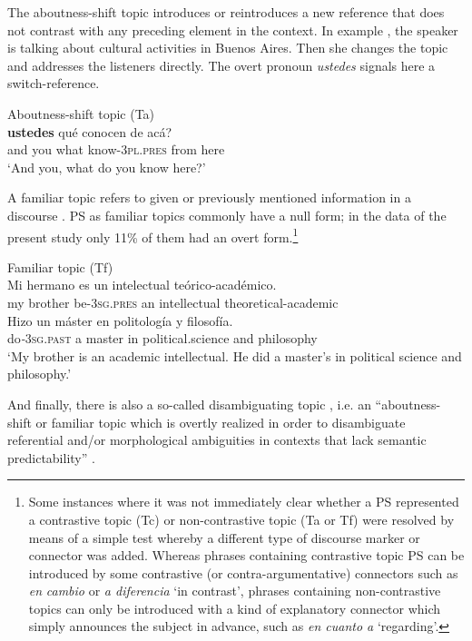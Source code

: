 \documentclass[output=paper]{langsci/langscibook}
\begin{document}
The aboutness-shift topic introduces or reintroduces a new reference that does not contrast with any preceding element in the context. In example , the speaker is talking about cultural activities in Buenos Aires. Then she changes the topic and addresses the listeners directly. The overt pronoun \textit{ustedes} signals here a switch-reference.


\ea\label{ex:pes:7}
             Aboutness-shift topic (Ta)\\
 \textbf{{ustedes}} qué  conocen    de acá?\\
       and  you    what  know-\textsc{3pl}.\textsc{pres} from here\\
\glt ‘And you, what do you know here?’
\z

A familiar topic refers to given or previously mentioned information in a discourse . PS as familiar topics commonly have a null form; in the data of the present study only 11\% of them had an overt form.\footnote{Some instances where it was not immediately clear whether a PS represented a contrastive topic (Tc) or non-contrastive topic (Ta or Tf) were resolved by means of a simple test whereby a different type of discourse marker or connector was added. Whereas phrases containing contrastive topic PS can be introduced by some contrastive (or contra-argumentative) connectors such as \textit{en} \textit{cambio} or \textit{a diferencia} ‘in contrast’, phrases containing non-contrastive topics can only be introduced with a kind of explanatory connector which simply announces the subject in advance, such as \textit{en cuanto a} ‘regarding’.}


\ea\label{ex:pes:8}
{             Familiar topic (Tf)}\\
\gll Mi hermano  es    un  intelectual  teórico-académico. \\
       my brother  be-\textsc{3sg}.\textsc{pres}  an  intellectual  theoretical-academic\\
\gll Hizo    un máster  en  politología    y  filosofía.\\
     do\textit{{}-}\textsc{3sg}.\textsc{past} a master  in  political.science  and  philosophy\\
\glt ‘My brother is an academic intellectual. He did a master’s in political science and philosophy.’
\z

And finally, there is also a so-called disambiguating topic , i.e. an ``aboutness-shift or familiar topic which is overtly realized in order to disambiguate referential and/or morphological ambiguities in contexts that lack semantic predictability'' \citep[62]{Peskova2014}.
\end{document}

